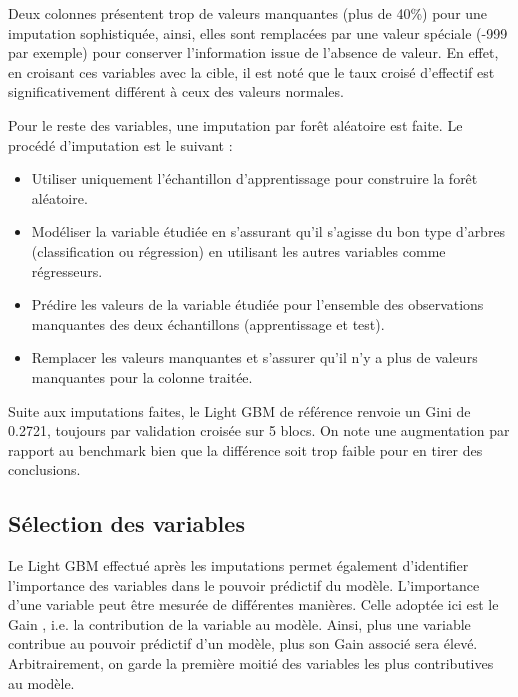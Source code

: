 \documentclass[french]{article}
\begin{document}
\begin{multicols}{2}
Deux colonnes présentent trop de valeurs manquantes (plus de 40\%) pour une imputation sophistiquée, ainsi, elles sont remplacées par une valeur spéciale (-999 par exemple) pour conserver l'information issue de l'absence de valeur. En effet, en croisant ces variables avec la cible, il est noté que le taux croisé d'effectif est significativement différent à ceux des valeurs normales.

Pour le reste des variables, une imputation par forêt aléatoire est faite. Le procédé d'imputation est le suivant :
\begin{itemize}
    \item Utiliser uniquement l'échantillon d'apprentissage pour construire la forêt aléatoire.
    \item Modéliser la variable étudiée en s'assurant qu'il s'agisse du bon type d'arbres (classification ou régression) en utilisant les autres variables comme régresseurs.
    \item Prédire les valeurs de la variable étudiée pour l'ensemble des observations manquantes des deux échantillons (apprentissage et test).
    \item Remplacer les valeurs manquantes et s'assurer qu'il n'y a plus de valeurs manquantes pour la colonne traitée.
\end{itemize}

Suite aux imputations faites, le Light GBM de référence renvoie un Gini de 0.2721, toujours par validation croisée sur 5 blocs. On note une augmentation par rapport au benchmark bien que la différence soit trop faible pour en tirer des conclusions.

\subsection{Sélection des variables}

Le Light GBM effectué après les imputations permet également d'identifier l'importance des variables dans le pouvoir prédictif du modèle. L'importance d'une variable peut être mesurée de différentes manières. Celle adoptée ici est le \og Gain \fg{}, i.e. la contribution de la variable au modèle. Ainsi, plus une variable contribue au pouvoir prédictif d'un modèle, plus son \og Gain \fg{} associé sera élevé. Arbitrairement, on garde la première moitié des variables les plus contributives au modèle.


\end{multicols}
\end{document}
